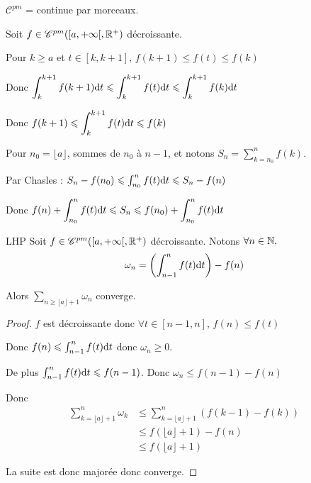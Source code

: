 $\mathscr C^{pm}$ = continue par morceaux.

Soit $f \in \mathscr C^{pm}( [a, + \infty[ , \mathbb{R}^+)$ décroissante. 

Pour $k \geqslant a$ et $ t \in [k, k+ 1 ], \, f(k + 1) \leqslant f(t) \leqslant f(k)$

Donc $\displaystyle \int_{k}^{k + 1} f(k + 1) \text d t \leqslant \int_{k}^{k + 1} f(t) \text d t \leqslant \int_{k}^{k + 1} f(k) \text d t$

Donc $\displaystyle f(k + 1) \leqslant \int_{k}^{k + 1} f(t) \text d t \leqslant f(k)$

Pour $n_0 = \lfloor a \rfloor$, sommes de $n_0$ à $n - 1$, et notons $\displaystyle S_n = \sum_{k = n_0}^{n} f(k)$.

Par Chasles : $S_n - f(n_0) \leqslant \int_{n_0}^{n} f(t) \text d t \leqslant S_n - f(n)$

Donc $\displaystyle f(n) + \int_{n_0}^{n} f(t) \text d t \leqslant S_n \leqslant f(n_0) + \int_{n_0}^{n} f(t) \text d t$


\begin{theoreme}{LHP}{}
    Soit $f \in \mathscr C^{pm}([a, + \infty[, \mathbb{R}^+)$ décroissante. 
    Notons $\forall n \in \mathbb{N},$ 
    $$\omega_n = \left( \int_{n - 1 }^{n } f(t) \text d t \right) - f(n)$$

    Alors $\displaystyle \sum_{n \geqslant \lfloor a \rfloor + 1} \omega_n$ converge.
\end{theoreme}


\begin{proof}
    $f$ est décroissante donc $\forall t \in [n - 1, n], \, f(n) \leqslant f(t)$ 

    Donc $f(n) \leqslant \int_{n - 1}^{n} f(t) \text d t$ donc $\omega_n \geqslant 0$.

    De plus $\int_{n - 1 }^{n } f(t) \text d t \leqslant f(n - 1)$. Donc $\omega_n \leqslant f(n - 1 ) - f(n)$

    Donc 
    \begin{align*}
        \sum_{k = \lfloor a \rfloor + 1}^{n} \omega_k & \leqslant \sum_{k = \lfloor a \rfloor + 1}^{n } (f(k - 1) - f(k)) \\
                                                        & \leqslant f(\lfloor a \rfloor + 1) - f(n) \\
                                                        & \leqslant f(\lfloor a \rfloor + 1)
    \end{align*}

    La suite est donc majorée donc converge. 
\end{proof}

